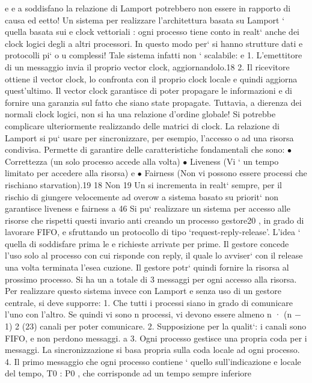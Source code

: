 \documentclass[a4paper,12pt]{article}
\begin{document}
e e
a
soddisfano la relazione di Lamport potrebbero non essere in rapporto di
causa ed eetto!
Un sistema per realizzare l'architettura basata su Lamport ` quella basata sui
e
clock vettoriali : ogni processo tiene conto in realt` anche dei clock logici degli
a
altri processori. In questo modo per` si hanno strutture dati e protocolli pi`
o
u
complessi! Tale sistema infatti non ` scalabile:
e
1. L'emettitore di un messaggio invia il proprio vector clock, aggiornandolo.18
2. Il ricevitore ottiene il vector clock, lo confronta con il proprio clock locale
e quindi aggiorna quest'ultimo.
Il vector clock garantisce di poter propagare le informazioni e di fornire una
garanzia sul fatto che siano state propagate. Tuttavia, a dierenza dei normali
clock logici, non si ha una relazione d'ordine globale! Si potrebbe complicare
ulteriormente realizzando delle matrici di clock.
La relazione di Lamport si pu` usare per sincronizzare, per esempio, l'accesso
o
ad una risorsa condivisa. Permette di garantire delle caratteristiche fondamentali che sono:
$\bullet$ Correttezza (un solo processo accede alla volta)
$\bullet$ Liveness (Vi ` un tempo limitato per accedere alla risorsa)
e
$\bullet$ Fairness (Non vi possono essere processi che rischiano starvation).19
18 Non
19 Un
si incrementa in realt` sempre, per il rischio di giungere velocemente ad overow
a
sistema basato su priorit` non garantisce liveness e fairness
a
46
Si pu` realizzare un sistema per accesso alle risorse che rispetti questi invario
anti creando un processo gestore20 , in grado di lavorare FIFO, e sfruttando un
protocollo di tipo {`}request-reply-release'. L'idea ` quella di soddisfare prima le
e
richieste arrivate per prime. Il gestore concede l'uso solo al processo con cui
risponde con reply, il quale lo avviser` con il release una volta terminata l'esea
cuzione. Il gestore potr` quindi fornire la risorsa al prossimo processo. Si ha un
a
totale di 3 messaggi per ogni accesso alla risorsa.
Per realizzare questo sistema invece con Lamport e senza uso di un gestore
centrale, si deve supporre:
1. Che tutti i processi siano in grado di comunicare l'uno con l'altro. Se
quindi vi sono n processi, vi devono essere almeno
n · (n $-$ 1)
2
(23)
canali per poter comunicare.
2. Supposizione per la qualit`: i canali sono FIFO, e non perdono messaggi.
a
3. Ogni processo gestisce una propria coda per i messaggi. La sincronizzazione si basa propria sulla coda locale ad ogni
processo.
4. Il primo messaggio che ogni processo contiene ` quello sull'indicazione
e
locale del tempo, T0 : P0 , che corrisponde ad un tempo sempre inferiore
\end{document}
